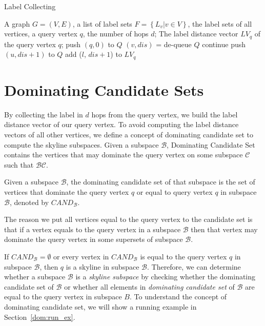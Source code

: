 \begin{algorithm}[H]
  \caption{Label Collecting}
  \label{algo:graph_collect}
  \begin{algorithmic}[1]
  \show\LOOP
    \REQUIRE A graph $G=(V,E)$, a list of label sets $F=\left\{L_v | v \in V\right\}$, the label sets of all vertices, a query vertex $q$, the number of hops $d$;
    \ENSURE The label distance vector $LV_q$ of the query vertex $q$;
    \STATE push $\left(q, 0\right)$ to $Q$
        \STATE $\left( v, dis\right)$ = de-queue $Q$
            \STATE continue
        \ENDIF
            \STATE push $\left(u, dis+1\right)$ to $Q$
                    \STATE add ($l$, $dis+1$) to $LV_q$
                \ENDIF
            \ENDFOR
        \ENDFOR
    \ENDWHILE
  \end{algorithmic}
\end{algorithm}

\section{Dominating Candidate Sets}
\label{sec:dom-cand}

By collecting the label in $d$ hops from the query vertex, we build the label distance vector of our query vertex. To avoid computing the label distance vectors of all other vertices, we define a concept of dominating candidate set to compute the skyline subspaces. Given a subspace $\mathcal{B}$, Dominating Candidate Set contains the vertices that may dominate the query vertex on some subspace $\mathcal{C}$ such that $\mathcal{B} \mathcal{C}$.

\begin{definition}
Given a subspace $\mathcal{B}$, the dominating candidate set of that subspace is the set of vertices that dominate the query vertex $q$ or equal to query vertex $q$ in subspace $\mathcal{B}$, denoted by $\mathit{CAND}_\mathcal{B}$.
\end{definition}

The reason we put all vertices equal to the query vertex to the candidate set is that if a vertex equals to the query vertex in a subspace $\mathcal{B}$ then that vertex may dominate the query vertex in some supersets of subspace $\mathcal{B}$. 

If $\mathit{CAND}_\mathcal{B} = \emptyset$ or every vertex in $\mathit{CAND}_\mathcal{B}$ is equal to the query vertex $q$ in subspace $\mathcal{B}$, then $q$ is a skyline in subspace $\mathcal{B}$. Therefore, we can determine whether a subspace $\mathcal{B}$ is a \emph{skyline subspace} by checking whether the dominating candidate set of $\mathcal{B}$ or whether all elements in \emph{dominating candidate set} of $\mathcal{B}$ are equal to the query vertex in subspace $B$. To understand the concept of dominating candidate set, we will show a running example in Section~\ref{dom:run_ex}.

